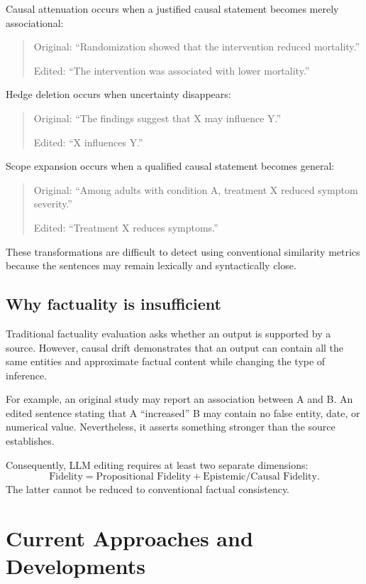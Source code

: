\documentclass[11pt]{article}
\begin{document}
Causal attenuation occurs when a justified causal statement becomes merely associational:
\begin{quote}
Original: ``Randomization showed that the intervention reduced mortality.''

Edited: ``The intervention was associated with lower mortality.''
\end{quote}

Hedge deletion occurs when uncertainty disappears:
\begin{quote}
Original: ``The findings suggest that X may influence Y.''

Edited: ``X influences Y.''
\end{quote}

Scope expansion occurs when a qualified causal statement becomes general:
\begin{quote}
Original: ``Among adults with condition A, treatment X reduced symptom severity.''

Edited: ``Treatment X reduces symptoms.''
\end{quote}

These transformations are difficult to detect using conventional similarity metrics because the sentences may remain lexically and syntactically close.

\subsection{Why factuality is insufficient}

Traditional factuality evaluation asks whether an output is supported by a source. However, causal drift demonstrates that an output can contain all the same entities and approximate factual content while changing the type of inference.

For example, an original study may report an association between A and B. An edited sentence stating that A ``increased'' B may contain no false entity, date, or numerical value. Nevertheless, it asserts something stronger than the source establishes.

Consequently, LLM editing requires at least two separate dimensions:
\[
  \text{Fidelity}
  = \text{Propositional Fidelity}
  + \text{Epistemic/Causal Fidelity}.
\]
The latter cannot be reduced to conventional factual consistency.

\section{Current Approaches and Developments}
\label{sec:current-approaches}
\end{document}

